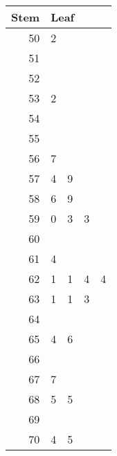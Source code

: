 \begin{tabular}{r|cccc}
  \hline
  Stem & \multicolumn{4}{l}{Leaf} \\
  \hline
  50 & 2 &   &   &   \\
  51 &   &   &   &   \\
  52 &   &   &   &   \\
  53 & 2 &   &   &   \\
  54 &   &   &   &   \\
  55 &   &   &   &   \\
  56 & 7 &   &   &   \\
  57 & 4 & 9 &   &   \\
  58 & 6 & 9 &   &   \\
  59 & 0 & 3 & 3 &   \\
  60 &   &   &   &   \\
  61 & 4 &   &   &   \\
  62 & 1 & 1 & 4 & 4 \\
  63 & 1 & 1 & 3 &   \\
  64 &   &   &   &   \\
  65 & 4 & 6 &   &   \\
  66 &   &   &   &   \\
  67 & 7 &   &   &   \\
  68 & 5 & 5 &   &   \\
  69 &   &   &   &   \\
  70 & 4 & 5 &   &   \\
  \hline
\end{tabular}
